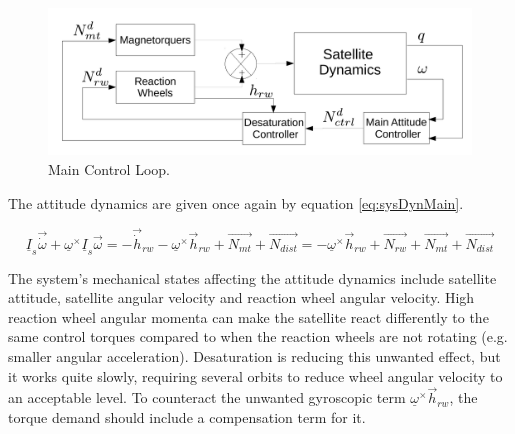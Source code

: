 \begin{figure}[h!]
	\centering 
	\includegraphics[width=160mm]{figures/mainLoop.pdf}	
	\caption{Main Control Loop.}
	\label{fig:mainLoop}
\end{figure}

The attitude dynamics are given once again by equation \ref{eq:sysDynMain}. 

\begin{equation}
\underline{I}_{s}\vec{\dot{\omega}} + \underline{\omega}^\times\underline{I}_{s}\vec{\omega} = -\vec{\dot{h}}_{rw} -  \underline{\omega}^\times \vec{{h}}_{rw} + \vec{N_{mt}}  + \vec{N_{dist}} =  -  \underline{\omega}^\times \vec{{h}}_{rw} + \vec{N_{rw}} + \vec{N_{mt}}  + \vec{N_{dist}}
\label{eq:sysDynMain} 
\end{equation}

The system's mechanical states affecting the attitude dynamics include satellite attitude, satellite angular velocity and reaction wheel angular velocity. High reaction wheel angular momenta can make the satellite react differently to the same control torques compared to when the reaction wheels are not rotating (e.g. smaller angular acceleration). Desaturation is reducing this unwanted effect, but it works quite slowly, requiring several orbits to reduce wheel angular velocity to an acceptable level. To counteract the unwanted gyroscopic term $\underline{\omega}^\times \vec{{h}}_{rw}$, the torque demand should include a compensation term for it.








